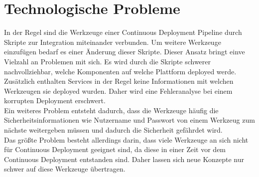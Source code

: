 \section{Technologische Probleme}
In der Regel sind die Werkzeuge einer Continuous Deployment Pipeline durch Skripte zur Integration miteinander verbunden. Um weitere Werkzeuge einzufügen bedarf es einer Änderung dieser Skripte. Dieser Ansatz bringt einve Vielzahl an Problemen mit sich. Es wird durch die Skripte schwerer nachvollziehbar, welche Komponenten auf welche Plattform deployed werde. Zusätzlich enthalten Services in der Regel keine Informationen mit welchen Werkzeugen sie deployed wurden. Daher wird eine Fehleranalyse bei einem korrupten Deployment erschwert.\\
Ein weiteres Problem entsteht dadurch, dass die Werkzeuge häufig die Sicherheitsinformationen wie Nutzername und Passwort von einem Werkzeug zum nächste weitergeben müssen und dadurch die Sicherheit gefährdet wird. \\
Das größte Problem besteht allerdings darin, dass viele Werkzeuge an sich nicht für Continuous Deployment geeignet sind, da diese in einer Zeit vor dem Continuous Deployment entstanden sind. Daher lassen sich neue Konzepte nur schwer auf diese Werkzeuge übertragen.